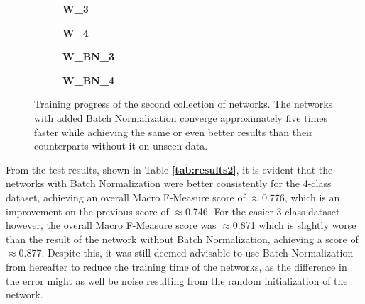 \begin {figure}[!htb]
	\begin {subfigure}[b]{0.4\linewidth}
		\scalebox{0.65}{}
		\caption{\textbf{W\_3}}
	\end {subfigure}\hspace{1.75cm}
	\begin {subfigure}[b]{0.4\linewidth}
		\scalebox{0.65}{}
		\caption{\textbf{W\_4}}
	\end {subfigure}

	\begin {subfigure}[b]{0.4\linewidth}
		\scalebox{0.65}{}
		\caption{\textbf{W\_BN\_3}}
	\end {subfigure}\hspace{1.75cm}
	\begin {subfigure}[b]{0.4\linewidth}
		\scalebox{0.65}{}
		\caption{\textbf{W\_BN\_4}}
	\end {subfigure}

		\caption[Training progress of the second collection of networks.]{Training progress of the second collection of networks. The networks with added Batch Normalization converge approximately five times faster while achieving the same or even better results than their counterparts without it on unseen data.}
		\label{fig:weighted_weighted_batchnorm_training}
\end {figure}

\noindent From the test results, shown in Table \textbf{\ref{tab:results2}}, it is evident that the networks with Batch Normalization were better consistently for the 4-class dataset, achieving an overall Macro F-Measure score of $\approx$0.776, which is an improvement on the previous score of $\approx$0.746. For the easier 3-class dataset however, the overall Macro F-Measure score was $\approx$0.871 which is slightly worse than the result of the network without Batch Normalization, achieving a score of $\approx$0.877. Despite this, it was still deemed advisable to use Batch Normalization from hereafter to reduce the training time of the networks, as the difference in the error might as well be noise resulting from the random initialization of the network.\\

